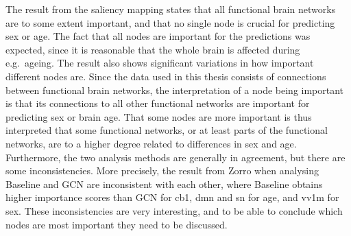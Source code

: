         


The result from the saliency mapping states that all functional brain networks are to some extent important, and that no single node is crucial for predicting sex or age. The fact that all nodes are important for the predictions was expected, since it is reasonable that the whole brain is affected during e.g.\ ageing. The result also shows significant variations in how important different nodes are. Since the data used in this thesis consists of connections between functional brain networks, the interpretation of a node being important is that its connections to all other functional networks are important for predicting sex or brain age. That some nodes are more important is thus interpreted that some functional networks, or at least parts of the functional networks, are to a higher degree related to differences in sex and age. Furthermore, the two analysis methods are generally in agreement, but there are some inconsistencies. More precisely, the result from Zorro when analysing Baseline and GCN are inconsistent with each other, where Baseline obtains higher importance scores than GCN for \acrshort{cb1}, \acrshort{dmn} and \acrshort{sn} for age, and \acrshort{vv1m} for sex. These inconsistencies are very interesting, and to be able to conclude which nodes are most important they need to be discussed. 




